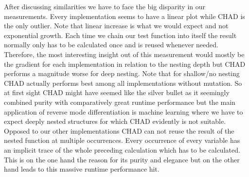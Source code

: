 After discussing similarities we have to face the big disparity in our measurements. Every implementation seems to have a linear plot while CHAD is the only outlier. Note that linear increase is what we would expect and not exponential growth. Each time we chain our test function into itself the result normally only has to be calculated once and is reused whenever needed. Therefore, the most interesting insight out of this measurement would mostly be the gradient for each implementation in relation to the nesting depth but CHAD performs a magnitude worse for deep nesting. Note that for shallow/no nesting CHAD actually performs best among all implementations without mutation. So at first sight CHAD might have seemed like the silver bullet as it seemingly combined purity with comparatively great runtime performance but the main application of reverse mode differentiation is machine learning where we have to expect deeply nested structures for which CHAD evidently is not suitable. Opposed to our other implementations CHAD can not reuse the result of the nested function at multiple occurrences. Every occurrence of every variable has an implicit trace of the whole preceding calculation which has to be calculated. This is on the one hand the reason for its purity and elegance but on the other hand leads to this massive runtime performance hit.

